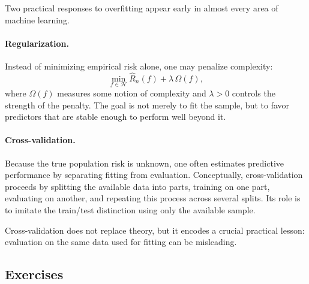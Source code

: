Two practical responses to overfitting appear early in almost every area of machine learning.

\paragraph{Regularization.}
Instead of minimizing empirical risk alone, one may penalize complexity:
\[
\min_{f\in\mathcal H} \widehat R_n(f)+\lambda\,\Omega(f),
\]
where $\Omega(f)$ measures some notion of complexity and $\lambda>0$ controls the strength of the penalty. The goal is not merely to fit the sample, but to favor predictors that are stable enough to perform well beyond it.

\paragraph{Cross-validation.}
Because the true population risk is unknown, one often estimates predictive performance by separating fitting from evaluation. Conceptually, cross-validation proceeds by splitting the available data into parts, training on one part, evaluating on another, and repeating this process across several splits. Its role is to imitate the train/test distinction using only the available sample.

Cross-validation does not replace theory, but it encodes a crucial practical lesson: evaluation on the same data used for fitting can be misleading.



\subsection*{Exercises}

